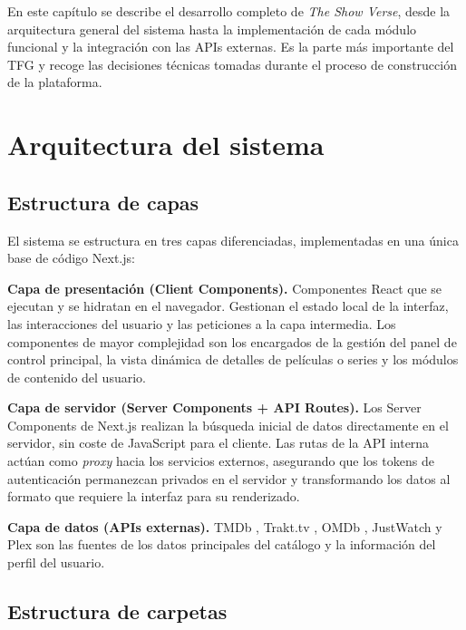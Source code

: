 En este capítulo se describe el desarrollo completo de \textit{The Show Verse}, desde la arquitectura general del sistema hasta la implementación de cada módulo funcional y la integración con las APIs externas. Es la parte más importante del TFG y recoge las decisiones técnicas tomadas durante el proceso de construcción de la plataforma.

\section{Arquitectura del sistema}

\subsection{Estructura de capas}

El sistema se estructura en tres capas diferenciadas, implementadas en una única base de código Next.js:

\textbf{Capa de presentación (Client Components).} Componentes React \parencite{React:2024} que se ejecutan y se hidratan en el navegador. Gestionan el estado local de la interfaz, las interacciones del usuario y las peticiones a la capa intermedia. Los componentes de mayor complejidad son los encargados de la gestión del panel de control principal, la vista dinámica de detalles de películas o series y los módulos de contenido del usuario.

\textbf{Capa de servidor (Server Components + API Routes).} Los Server Components de Next.js \parencite{Vercel:2024a,Meta:2024} realizan la búsqueda inicial de datos directamente en el servidor, sin coste de JavaScript para el cliente. Las rutas de la API interna actúan como \textit{proxy} hacia los servicios externos, asegurando que los tokens de autenticación permanezcan privados en el servidor y transformando los datos al formato que requiere la interfaz para su renderizado.

\textbf{Capa de datos (APIs externas).} TMDb \parencite{TMDb:2024}, Trakt.tv \parencite{Trakt:2024}, OMDb \parencite{OMDb:2024}, JustWatch \parencite{JustWatch:2024} y Plex \parencite{Plex:2024} son las fuentes de los datos principales del catálogo y la información del perfil del usuario.

\subsection{Estructura de carpetas}


